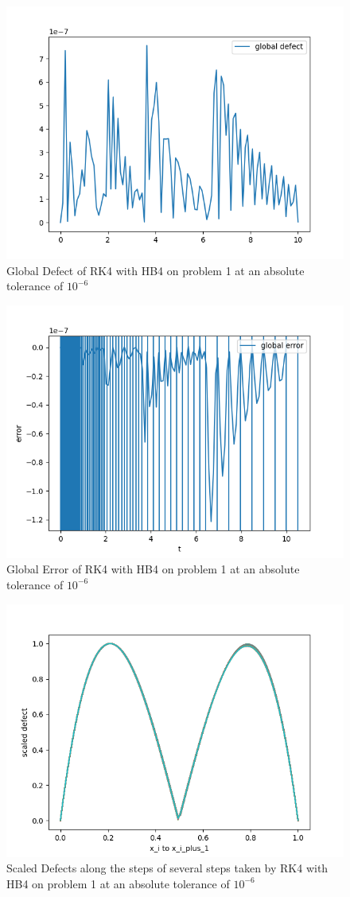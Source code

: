 \documentclass{article}
\begin{document}
\begin{figure}[H]
\centering
\includegraphics[width=0.7\linewidth]{./figures/rk4_with_hb4_p1_global_defect}
\caption{Global Defect of RK4 with HB4 on problem 1 at an absolute tolerance of $10^{-6}$}
\label{fig:rk4_with_hb4_p1_global_defect}
\end{figure}

\begin{figure}[H]
\centering
\includegraphics[width=0.7\linewidth]{./figures/rk4_with_hb4_p1_global_error}
\caption{Global Error of RK4 with HB4 on problem 1 at an absolute tolerance of $10^{-6}$}
\label{fig:rk4_with_hb4_p1_global_error}
\end{figure}

\begin{figure}[H]
\centering
\includegraphics[width=0.7\linewidth]{./figures/rk4_with_hb4_p1_scaled_defects}
\caption{Scaled Defects along the steps of several steps taken by RK4 with HB4 on problem 1 at an absolute tolerance of $10^{-6}$}
\label{fig:rk4_with_hb4_p1_scaled_defects}
\end{figure}
\end{document}
